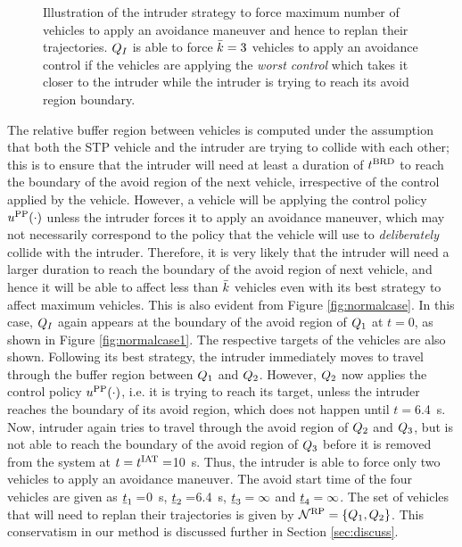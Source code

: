 \begin{figure}
\begin{subfigure}{.5\columnwidth}
  \subcaption{}
  \label{fig:worstcase4}
\end{subfigure}
\caption{Illustration of the intruder strategy to force maximum number of vehicles to apply an avoidance maneuver and hence to replan their trajectories. $Q_{I}$ is able to force $\bar{k}=3$ vehicles to apply an avoidance control if the vehicles are applying the \textit{worst control} which takes it closer to the intruder while the intruder is trying to reach its avoid region boundary. }
\label{fig:worstcase}
\end{figure}

The relative buffer region between vehicles is computed under the assumption that both the STP vehicle and the intruder are trying to collide with each other; this is to ensure that the intruder will need at least a duration of $t^\text{BRD}$ to reach the boundary of the avoid region of the next vehicle, irrespective of the control applied by the vehicle. However, a vehicle will be applying the control policy $u^{\text{PP}}(\cdot)$ unless the intruder forces it to apply an avoidance maneuver, which may not necessarily correspond to the policy that the vehicle will use to \textit{deliberately} collide with the intruder. Therefore, it is very likely that the intruder will need a larger duration to reach the boundary of the avoid region of next vehicle, and hence it will be able to affect less than $\bar{k}$ vehicles even with its best strategy to affect maximum vehicles. This is also evident from Figure \ref{fig:normalcase}. In this case, $Q_{I}$ again appears at the boundary of the avoid region of $Q_1$ at $t=0$, as shown in Figure \ref{fig:normalcase1}. The respective targets of the vehicles are also shown. Following its best strategy, the intruder immediately moves to travel through the buffer region between $Q_1$ and $Q_2$. However, $Q_2$ now applies the control policy $u^{\text{PP}}(\cdot)$, i.e. it is trying to reach its target, unless the intruder reaches the boundary of its avoid region, which does not happen until $t= $\SI{6.4}{\s}. Now, intruder again tries to travel through the avoid region of $Q_2$ and $Q_3$, but is not able to reach the boundary of the avoid region of $Q_3$ before it is removed from the system at $t=t^\text{IAT}=$\SI{10}{\s}. Thus, the intruder is able to force only two vehicles to apply an avoidance maneuver. The avoid start time of the four vehicles are given as $\underline{t}_1 = $\SI{0}{\s}, $\underline{t}_2 = $\SI{6.4}{\s}, $\underline{t}_3 = \infty$ and $\underline{t}_4 = \infty$. The set of vehicles that will need to replan their trajectories is given by $\mathcal{N}^\text{RP} = \{Q_1, Q_2\}$. This conservatism in our method is discussed further in Section \ref{sec:discuss}.

